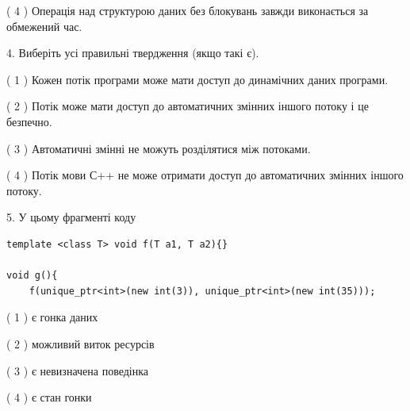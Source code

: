 \documentclass[12pt, ukrainian]{article}
\begin{document}
\begin {large}
{( 4 ) Операція над структурою даних без блокувань завжди виконається за обмежений час.%


4. Виберіть усі правильні твердження (якщо такі є).\par
\vspace{2mm}

( 1 ) Кожен потік програми може мати доступ до динамічних даних програми.%

( 2 ) Потік може мати доступ до автоматичних змінних іншого потоку і це безпечно.%

( 3 ) Автоматичні змінні не можуть розділятися між потоками.%

( 4 ) Потік мови С++ не може отримати доступ до автоматичних змінних іншого потоку.%


5. У цьому фрагменті коду
\begin{verbatim}
template <class T> void f(T a1, T a2){}

void g(){
    f(unique_ptr<int>(new int(3)), unique_ptr<int>(new int(35)));
\end{verbatim}

( 1 ) є гонка даних%

( 2 ) можливий виток ресурсів%

( 3 ) є невизначена поведінка%

( 4 ) є стан гонки%
}
\end {large}
\end{document}
